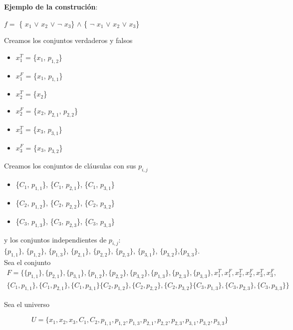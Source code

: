 \documentclass{article}
\begin{document}
\textbf{Ejemplo de la construción}:

$f = $   \{ $x_{1}$ $\vee$ $x_{2}$ $\vee$ $\neg$ $x_{3}$\} $\wedge$ \{ $\neg$ $x_{1}$ $\vee$ $x_{2}$ $\vee$ $x_{3}$\}

Creamos los conjuntos verdaderos y falsos

\begin{itemize}
    \item $x_{1}^{T}$ = \{$x_1$, $p_{1,2}$\}
    \item $x_{1}^{F}$ = \{$x_1$, $p_{1,1}$\}
    \item $x_{2}^{T}$ = \{$x_2$\}
    \item $x_{2}^{F}$ = \{$x_2$, $p_{2,1}$, $p_{2,2}$\}
    \item $x_{3}^{T}$ = \{$x_3$, $p_{3,1}$\}
    \item $x_{3}^{F}$ = \{$x_3$, $p_{3,2}$\}
\end{itemize}

Creamos los conjuntos de cláusulas con sus $p_{i,j}$

\begin{itemize}
    \item \{$C_1$, $p_{1,1}$\}, \{$C_1$, $p_{2,1}$\}, \{$C_1$, $p_{3,1}$\}
    \item \{$C_2$, $p_{1,2}$\}, \{$C_2$, $p_{2,2}$\}, \{$C_2$, $p_{3,2}$\}
    \item \{$C_3$, $p_{1,3}$\}, \{$C_3$, $p_{2,3}$\}, \{$C_3$, $p_{3,3}$\}
\end{itemize}

y los conjuntos independientes de $p_{i,j}$: \\

$\{p_{1,1}\}$, $\{p_{1,2}\}$, $\{p_{1,3}\}$, $\{p_{2,1}\}$, $\{p_{2,2}\}$, $\{p_{2,3}\}$, $\{p_{3,1}\}$, $\{p_{3,2}\}$,$\{p_{3,3}\}$. \\

Sea el conjunto
\begin{multline}
    F = \{ \{p_{1,1}\}, \{p_{2,1}\},\{p_{3,1}\},\{p_{1,2}\},\{p_{2,2}\},
    \{p_{3,2}\},\{p_{1,3}\}, \{p_{2,3}\},\{p_{3,3}\}, x_{1}^{T}, 
    x_{1}^{F}, x_{2}^{T}, x_{2}^{F}, x_{3}^{T}, x_{3}^{F},\\
    \{C_1, p_{1,1}\}, \{C_1, p_{2,1}\}, \{C_1, p_{3,1}\}
    \{C_2, p_{1,2}\}, \{C_2, p_{2,2}\}, \{C_2, p_{3,2}\} \{C_3, p_{1,3}\},
    \{C_3, p_{2,3}\}, \{C_3, p_{3,3}\}\}\
\end{multline} 

Sea el universo

\[U = \{x_1, x_2, x_3, C_1, C_2, p_{1,1}, p_{1,2}, p_{1,3}, p_{2,1}, p_{2,2} ,p_{2,3}, p_{3,1}, p_{3,2}, p_{3,3}\}\]
\end{document}
